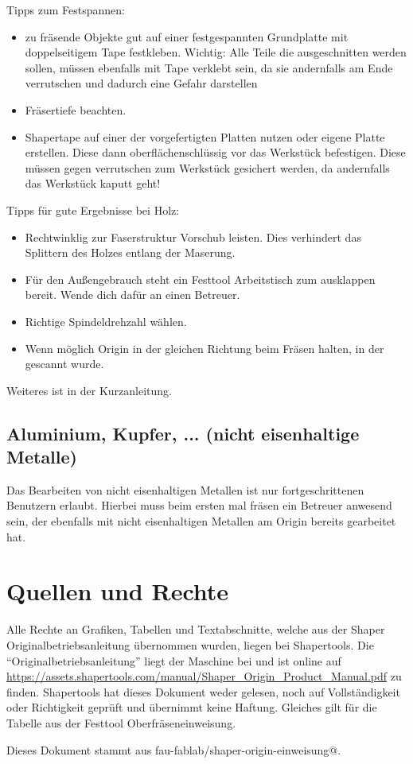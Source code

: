 \documentclass{\basedir/fablab-document}
\renewcommand{\todo}[1]{\textbf{\color{red}{TODO: #1}}}
\begin{document}
Tipps zum Festspannen:
\begin{itemize}
    \item zu fräsende Objekte gut auf einer festgespannten Grundplatte mit
        doppelseitigem Tape festkleben. Wichtig: Alle Teile die ausgeschnitten werden
        sollen, müssen ebenfalls mit Tape verklebt sein, da sie andernfalls am
        Ende verrutschen und dadurch eine Gefahr darstellen
    \item Fräsertiefe beachten.
    \item Shapertape auf einer der vorgefertigten Platten nutzen oder eigene
        Platte erstellen. Diese dann oberflächenschlüssig vor das Werkstück
        befestigen. Diese müssen gegen verrutschen zum Werkstück gesichert
        werden, da andernfalls das Werkstück kaputt geht!
\end{itemize}

Tipps für gute Ergebnisse bei Holz:
\begin{itemize}
    \item Rechtwinklig zur Faserstruktur Vorschub leisten. Dies verhindert
        das Splittern des Holzes entlang der Maserung.
    \item Für den Außengebrauch steht ein Festtool Arbeitstisch zum
        ausklappen bereit. Wende dich dafür an einen Betreuer.
    \item Richtige Spindeldrehzahl wählen.
    \item Wenn möglich Origin in der gleichen Richtung beim Fräsen
        halten, in der gescannt wurde.
\end{itemize}

Weiteres ist in der Kurzanleitung.

\subsection{Aluminium, Kupfer, ... (nicht eisenhaltige Metalle)}
Das Bearbeiten von nicht eisenhaltigen Metallen ist nur fortgeschrittenen
Benutzern erlaubt. Hierbei muss beim ersten mal fräsen ein Betreuer anwesend
sein, der ebenfalls mit nicht eisenhaltigen Metallen am Origin bereits gearbeitet hat.

\section{Quellen und Rechte}
\label{quellen}
Alle Rechte an Grafiken, Tabellen und Textabschnitte, welche aus der Shaper
Originalbetriebsanleitung übernommen wurden, liegen bei Shapertools. Die
\enquote{Originalbetriebsanleitung} liegt der Maschine bei und ist online auf
\url{https://assets.shapertools.com/manual/Shaper_Origin_Product_Manual.pdf}
zu finden. Shapertools hat dieses Dokument weder gelesen, noch auf Vollständigkeit
oder Richtigkeit geprüft und übernimmt keine Haftung.
Gleiches gilt für die Tabelle aus der Festtool Oberfräseneinweisung.

Dieses Dokument stammt aus fau-fablab/shaper-origin-einweisung@\Revision{}.

\todo{Klären, ob und wo CC-Lizenz gesetzt werden kann, dann ccLicense-Block einbinden.}
\end{document}
